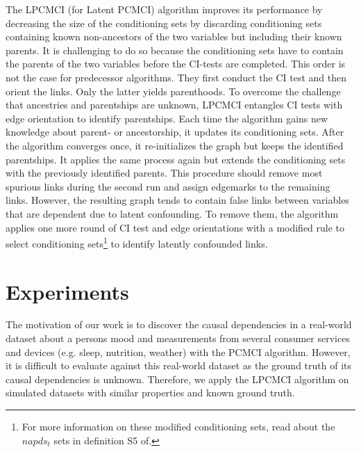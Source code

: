 \documentclass[conference]{IEEEtran}
\begin{document}
The LPCMCI (for Latent PCMCI) algorithm improves its performance by decreasing the size of the conditioning sets by discarding conditioning sets containing known non-ancestors of the two variables but including their known parents\cite{gerhardus_high-recall_2021}. It is challenging to do so because the conditioning sets have to contain the parents of the two variables before the CI-tests are completed. This order is not the case for predecessor algorithms. They first conduct the CI test and then orient the links. Only the latter yields parenthoods.
To overcome the challenge that ancestries and parentships are unknown, LPCMCI entangles CI tests with edge orientation to identify parentships. Each time the algorithm gains new knowledge about parent- or ancestorship, it updates its conditioning sets. After the algorithm converges once, it re-initializes the graph but keeps the identified parentships. 
It applies the same process again but extends the conditioning sets with the previously identified parents.
This procedure should remove most spurious links during the second run and assign edgemarks to the remaining links. 
However, the resulting graph tends to contain false links between variables that are dependent due to latent confounding. 
To remove them, the algorithm applies one more round of CI test and edge orientations with a modified rule to select conditioning sets\footnote{For more information on these modified conditioning sets, read about the $napds_t$ sets in definition S5 of\cite{gerhardus_high-recall_2021}.} 
to identify latently confounded links\cite{gerhardus_high-recall_2021}.


\section{Experiments}
The motivation of our work is to discover the causal dependencies in a real-world dataset about a persons mood and measurements from several consumer services and devices (e.g. sleep, nutrition, weather)\cite{reiser_predicting_2022} with the PCMCI algorithm. 
However, it is difficult to evaluate against this real-world dataset as the ground truth of its causal dependencies is unknown. Therefore, we apply the LPCMCI algorithm on simulated datasets with similar properties and known ground truth.
\end{document}
